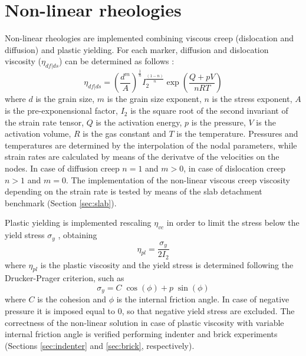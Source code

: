 \documentclass[hidelinks,11pt,a4paper]{article}
\begin{document}
\section{Non-linear rheologies}\label{sec:nonlinear}
Non-linear rheologies are implemented combining viscous creep (dislocation and diffusion) and plastic yielding. For each marker, diffusion and dislocation viscosity ($\eta_{df|ds}$) can be determined as follows \citep{Karato1993,Wang2016,Glerum2018}:
\begin{equation}\label{eq:viscous}
\eta_{df|ds}=\left(\frac{d^m}{A}\right)^{\frac{1}{n}}I_2^{\frac{(1-n)}{n}}\exp\left(\frac{Q+pV}{nRT}\right)
\end{equation}
where $d$ is the grain size, $m$ is the grain size exponent, $n$ is the stress exponent, $A$ is the pre-exponensional factor, $I_2$ is the square root of the second invariant of the strain rate tensor, $Q$ is the activation energy, $p$ is the pressure, $V$ is the activation volume, $R$ is the gas constant and $T$ is the temperature. Pressures and temperatures are determined by the interpolation of the nodal parameters, while strain rates are calculated by means of the derivatve of the velocities on the nodes. In case of diffusion creep $n=1$ and $m>0$, in case of dislocation creep $n>1$ and $m=0$. The implementation of the non-linear viscous creep viscosity depending on the strain rate is tested by means of the slab detachment benchmark (Section \ref{sec:slab}).

Plastic yielding is implemented rescaling $\eta_{vc}$ in order to limit the stress below the yield stress $\sigma_y$ \citep{Thieulot2008,Thieulot2014,Glerum2018}, obtaining
\begin{equation}\label{eq:plastic}
\eta_{pl}=\frac{\sigma_y}{2I_2}
\end{equation}
where $\eta_{pl}$ is the plastic viscosity and the yield stress is determined following the Drucker-Prager criterion, such as
\begin{equation}\label{eq:yield}
\sigma_y=C\;\cos(\phi)+p\;\sin(\phi)
\end{equation}
where $C$ is the cohesion and $\phi$ is the internal friction angle. In case of negative pressure it is imposed equal to 0, so that negative yield stress are excluded. The correctness of the non-linear solution in case of plastic viscosity with variable internal friction angle is verified performing indenter and brick experiments (Sections \ref{sec:indenter} and \ref{sec:brick}, respectively).
\end{document}
